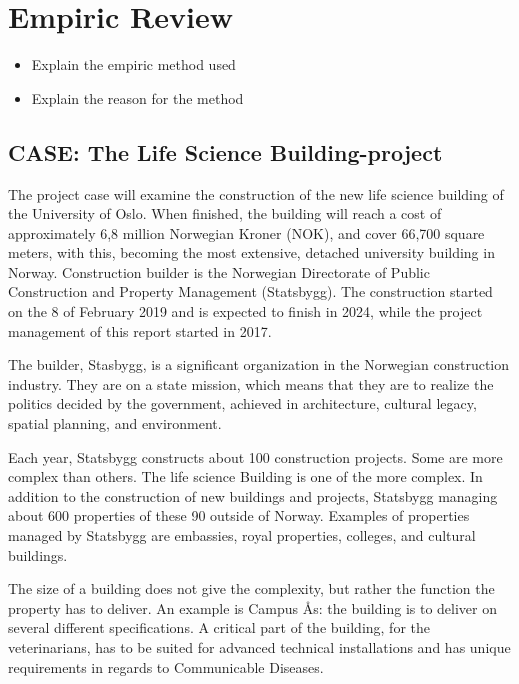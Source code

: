
\chapter{Empiric Review}
\begin{itemize}
    \item Explain the empiric method used
    \item Explain the reason for the method
\end{itemize}

\section{CASE: The Life Science Building-project}
The project case will examine the construction of the new life science building of the University of Oslo. When finished, the building will reach a cost of approximately 6,8 million Norwegian Kroner (NOK), and cover 66,700 square meters, with this, becoming the most extensive, detached university building in Norway. Construction builder is the Norwegian Directorate of Public Construction and Property Management (Statsbygg). The construction started on the 8 of February 2019 and is expected to finish in 2024, while the project management of this report started in 2017.

The builder, Stasbygg, is a significant organization in the Norwegian construction industry. They are on a state mission, which means that they are to realize the politics decided by the government, achieved in architecture, cultural legacy, spatial planning, and environment. 

Each year, Statsbygg constructs about 100 construction projects. Some are more complex than others. The life science Building is one of the more complex. In addition to the construction of new buildings and projects, Statsbygg managing about 600 properties of these 90 outside of Norway. Examples of properties managed by Statsbygg are embassies, royal properties, colleges, and cultural buildings. 

The size of a building does not give the complexity, but rather the function the property has to deliver. An example is Campus Ås: the building is to deliver on several different specifications. A critical part of the building, for the veterinarians, has to be suited for advanced technical installations and has unique requirements in regards to Communicable Diseases. 

